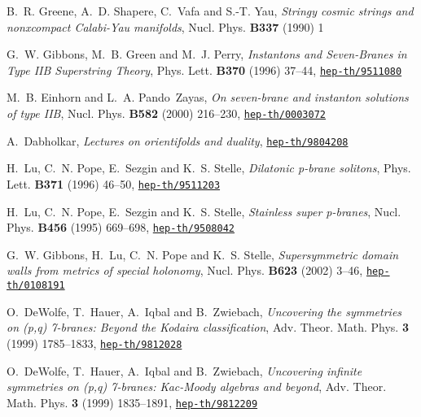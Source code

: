 \documentclass[12pt,a4paper]{article}
\begin{document}
\begin{thebibliography}{10}
B.~R. Greene, A.~D. Shapere, C.~Vafa  and S.-T. Yau, \emph{Stringy cosmic
  strings and nonxcompact Calabi-Yau manifolds}, Nucl. Phys. {\bf B337} (1990)
1

G.~W. Gibbons, M.~B. Green  and M.~J. Perry, \emph{Instantons and Seven-Branes
  in Type IIB Superstring Theory}, Phys. Lett. {\bf B370} (1996) 37--44,
\href{http://arXiv.org/abs/hep-th/9511080}{{\tt hep-th/9511080}}

M.~B. Einhorn and L.~A. Pando~Zayas, \emph{On seven-brane and instanton
  solutions of type IIB}, Nucl. Phys. {\bf B582} (2000) 216--230,
\href{http://arXiv.org/abs/hep-th/0003072}{{\tt hep-th/0003072}}

A.~Dabholkar, \emph{Lectures on orientifolds and duality},
\href{http://arXiv.org/abs/hep-th/9804208}{{\tt hep-th/9804208}}

H.~Lu, C.~N. Pope, E.~Sezgin  and K.~S. Stelle, \emph{Dilatonic p-brane
  solitons}, Phys. Lett. {\bf B371} (1996) 46--50,
\href{http://arXiv.org/abs/hep-th/9511203}{{\tt hep-th/9511203}}

H.~Lu, C.~N. Pope, E.~Sezgin  and K.~S. Stelle, \emph{Stainless super
  p-branes}, Nucl. Phys. {\bf B456} (1995) 669--698,
\href{http://arXiv.org/abs/hep-th/9508042}{{\tt hep-th/9508042}}

G.~W. Gibbons, H.~Lu, C.~N. Pope  and K.~S. Stelle, \emph{Supersymmetric domain
  walls from metrics of special holonomy}, Nucl. Phys. {\bf B623} (2002) 3--46,
\href{http://arXiv.org/abs/hep-th/0108191}{{\tt hep-th/0108191}}

O.~DeWolfe, T.~Hauer, A.~Iqbal  and B.~Zwiebach, \emph{Uncovering the
  symmetries on (p,q) 7-branes: Beyond the Kodaira classification}, Adv. Theor.
  Math. Phys. {\bf 3} (1999) 1785--1833,
\href{http://arXiv.org/abs/hep-th/9812028}{{\tt hep-th/9812028}}

O.~DeWolfe, T.~Hauer, A.~Iqbal  and B.~Zwiebach, \emph{Uncovering infinite
  symmetries on (p,q) 7-branes: Kac-Moody algebras and beyond}, Adv. Theor.
  Math. Phys. {\bf 3} (1999) 1835--1891,
\href{http://arXiv.org/abs/hep-th/9812209}{{\tt hep-th/9812209}}


\end{thebibliography}
\end{document}
